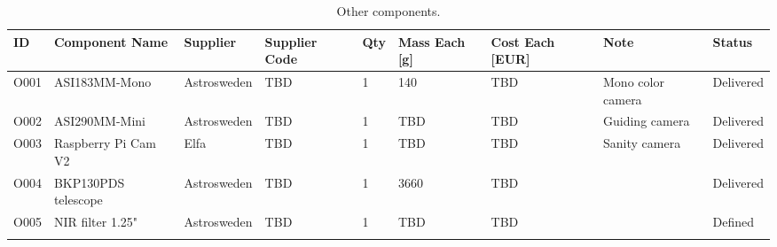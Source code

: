 

\begin{longtable}{|m{}|m{}|m{}|m{}|m{}|m{}|m{}|m{}|m{}|}

\hline
\textbf{ID} & \textbf{Component Name} & \textbf{Supplier} & \textbf{Supplier Code} & \textbf{Qty} & \textbf{Mass Each [g]} & \textbf{Cost Each [EUR]} & \textbf{Note} & \textbf{Status} \\ \hline

O001 & ASI183MM-Mono			& Astrosweden 	& TBD 	& 1 & 140 	& TBD & Mono color camera & Delivered \\\hline
O002 & ASI290MM-Mini			& Astrosweden 	& TBD 	& 1 & TBD 	& TBD & Guiding camera & Delivered \\\hline
O003 & Raspberry Pi Cam V2 		& Elfa 			& TBD 	& 1 & TBD 	& TBD & Sanity camera & Delivered \\\hline
O004 & BKP130PDS telescope 		& Astrosweden 	& TBD 	& 1 & 3660 	& TBD & & Delivered \\\hline
O005 & NIR filter 1.25" 		& Astrosweden 	& TBD 	& 1 & TBD 	& TBD & & Defined \\\hline



\caption{Other components.}
\label{tab:component-other}
\end{longtable}
\raggedbottom